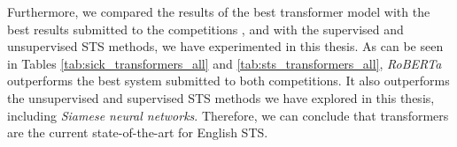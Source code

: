 \begin{table}[htb]
	\centering
	\caption[Results comparison for STS2017 with leader board results]{Results for the STS2017 dataset with different variants of Siamese Neural Network. For each variant, Pearson Correlation ($\bm{\rho}$) is reported between the predicted values and the gold labels of the test set.  }  
	\label{tab:sts_transformers_all}
\end{table}

Furthermore, we compared the results of the best transformer model with the best results submitted to the competitions \autocite{cer-etal-2017-semeval, marelli-etal-2014-semeval}, and with the supervised and unsupervised STS methods, we have experimented in this thesis. As can be seen in Tables \ref{tab:sick_transformers_all} and \ref{tab:sts_transformers_all}, \textit{RoBERTa} outperforms the best system submitted to both competitions. It also outperforms the unsupervised and supervised STS methods we have explored in this thesis, including \textit{Siamese neural networks}. Therefore, we can conclude that transformers are the current state-of-the-art for English STS.

